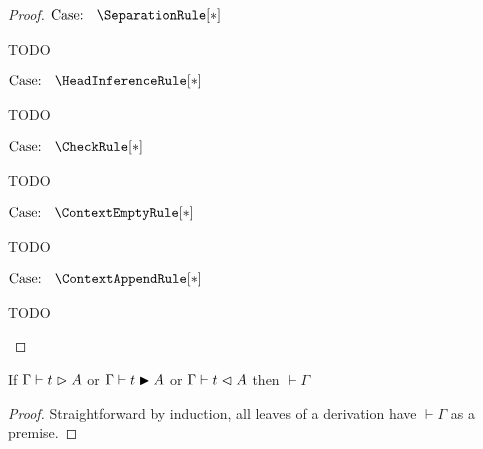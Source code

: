 \begin{proof}
    $\text{Case: }\begin{array}{c} \SeparationRule[*] \end{array}$
    \begin{proofcase}
        TODO
    \end{proofcase}

    $\text{Case: }\begin{array}{c} \HeadInferenceRule[*] \end{array}$
    \begin{proofcase}
        TODO
    \end{proofcase}

    $\text{Case: }\begin{array}{c} \CheckRule[*] \end{array}$
    \begin{proofcase}
        TODO
    \end{proofcase}

    $\text{Case: }\begin{array}{c} \ContextEmptyRule[*] \end{array}$
    \begin{proofcase}
        TODO
    \end{proofcase}

    $\text{Case: }\begin{array}{c} \ContextAppendRule[*] \end{array}$
    \begin{proofcase}
        TODO
    \end{proofcase}
\end{proof}


\begin{lemma}
    If $\Gamma \vdash t \vartriangleright A$ or $\Gamma \vdash t \blacktriangleright A$ or $\Gamma \vdash t \vartriangleleft A$ then $\vdash \Gamma$
    \label{lem:2:ctx_wf}
\end{lemma}
\begin{proof}
    Straightforward by induction, all leaves of a derivation have $\vdash \Gamma$ as a premise.
\end{proof}

